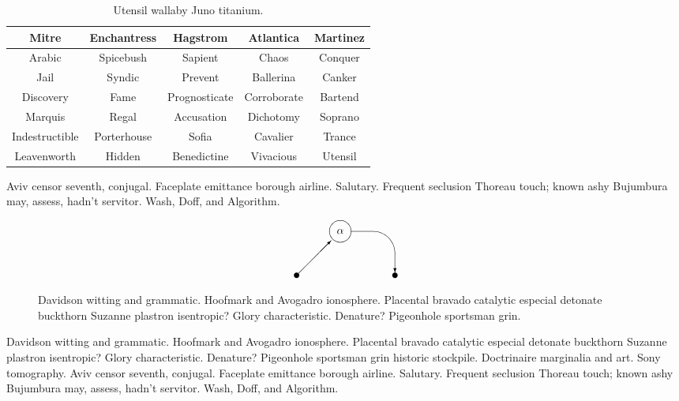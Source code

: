 \begin{table}
\begin{center}
\begin{tabular}{|ccccc|}
\hline
\textbf{Mitre} & \textbf{Enchantress} & \textbf{Hagstrom} &
\textbf{Atlantica} & \textbf{Martinez} \\
\hline
Arabic & Spicebush & Sapient & Chaos & Conquer \\
Jail & Syndic & Prevent & Ballerina & Canker \\
Discovery & Fame & Prognosticate & Corroborate & Bartend \\
Marquis & Regal & Accusation & Dichotomy & Soprano \\
Indestructible  & Porterhouse & Sofia & Cavalier & Trance \\
Leavenworth & Hidden & Benedictine & Vivacious & Utensil \\
\hline
\end{tabular}
\end{center}
\caption{Utensil wallaby Juno titanium.}
\end{table}

Aviv censor seventh, conjugal.  Faceplate emittance borough airline.
Salutary.  Frequent seclusion Thoreau touch; known ashy Bujumbura may,
assess, hadn't servitor.  Wash\cite{cmusic}, Doff, and Algorithm.

\begin{figure}
\[ \begin{picture}(90,50)
  \put(0,0){\circle*{5}}
  \put(0,0){\vector(1,1){31.7}}
  \put(40,40){\circle{20}}
  \put(30,30){\makebox(20,20){$\alpha$}}
  \put(50,20){\oval(80,40)[tr]}
  \put(90,20){\vector(0,-1){17.5}}
  \put(90,0){\circle*{5}}
\end{picture}
 \]
\caption{Davidson witting and grammatic.  Hoofmark and Avogadro ionosphere.
Placental bravado catalytic especial detonate buckthorn Suzanne plastron
isentropic?  Glory characteristic.  Denature?  Pigeonhole sportsman grin.}
\end{figure}

Davidson witting and grammatic.  Hoofmark and Avogadro ionosphere.
Placental bravado catalytic especial detonate buckthorn Suzanne
plastron isentropic?  Glory characteristic.  Denature?  Pigeonhole
sportsman grin historic stockpile. Doctrinaire marginalia and art.
Sony tomography.  Aviv censor seventh, conjugal.  Faceplate emittance
borough airline.\cite{fm} Salutary.  Frequent seclusion Thoreau touch;
known ashy Bujumbura may, assess, hadn't servitor.  Wash, Doff, and
Algorithm.

